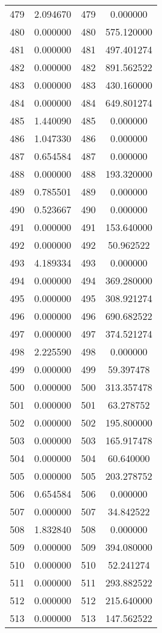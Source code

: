 \documentclass[12pt]{article}
\begin{document}
\begin{longtable}{@{}cccc@{}}
479 & 2.094670 & 479 & 0.000000 \\
480 & 0.000000 & 480 & 575.120000 \\
481 & 0.000000 & 481 & 497.401274 \\
482 & 0.000000 & 482 & 891.562522 \\
483 & 0.000000 & 483 & 430.160000 \\
484 & 0.000000 & 484 & 649.801274 \\
485 & 1.440090 & 485 & 0.000000 \\
486 & 1.047330 & 486 & 0.000000 \\
487 & 0.654584 & 487 & 0.000000 \\
488 & 0.000000 & 488 & 193.320000 \\
489 & 0.785501 & 489 & 0.000000 \\
490 & 0.523667 & 490 & 0.000000 \\
491 & 0.000000 & 491 & 153.640000 \\
492 & 0.000000 & 492 & 50.962522 \\
493 & 4.189334 & 493 & 0.000000 \\
494 & 0.000000 & 494 & 369.280000 \\
495 & 0.000000 & 495 & 308.921274 \\
496 & 0.000000 & 496 & 690.682522 \\
497 & 0.000000 & 497 & 374.521274 \\
498 & 2.225590 & 498 & 0.000000 \\
499 & 0.000000 & 499 & 59.397478 \\
500 & 0.000000 & 500 & 313.357478 \\
501 & 0.000000 & 501 & 63.278752 \\
502 & 0.000000 & 502 & 195.800000 \\
503 & 0.000000 & 503 & 165.917478 \\
504 & 0.000000 & 504 & 60.640000 \\
505 & 0.000000 & 505 & 203.278752 \\
506 & 0.654584 & 506 & 0.000000 \\
507 & 0.000000 & 507 & 34.842522 \\
508 & 1.832840 & 508 & 0.000000 \\
509 & 0.000000 & 509 & 394.080000 \\
510 & 0.000000 & 510 & 52.241274 \\
511 & 0.000000 & 511 & 293.882522 \\
512 & 0.000000 & 512 & 215.640000 \\
513 & 0.000000 & 513 & 147.562522 \\

\end{longtable}
\end{document}
